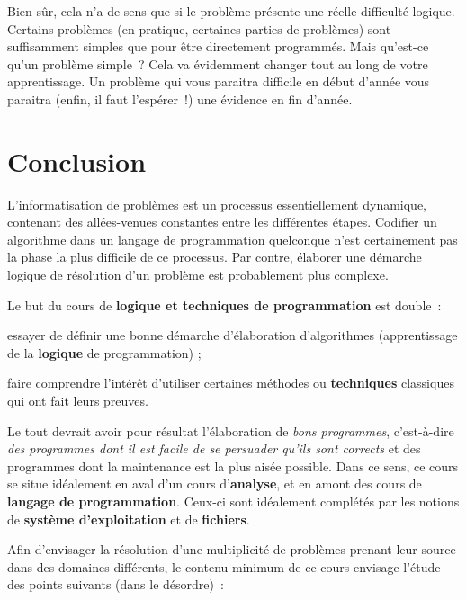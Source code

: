 	Bien sûr, cela n’a de sens que si le problème présente
	une réelle difficulté logique. Certains problèmes (en pratique,
	certaines parties de problèmes) sont suffisamment simples que pour être
	directement programmés. Mais qu’est-ce
	qu’un problème simple~? Cela va évidemment changer
	tout au long de votre apprentissage. Un problème qui vous paraitra
	difficile en début d’année vous paraitra (enfin, il
	faut l’espérer~!) une évidence en fin
	d’année.

\section{Conclusion}

	L’informatisation de problèmes est un processus essentiellement
	dynamique, contenant des allées-venues constantes entre les différentes
	étapes. Codifier un algorithme dans un langage de programmation
	quelconque n’est certainement pas la phase la plus difficile de ce
	processus. Par contre, élaborer une démarche logique de résolution d’un
	problème est probablement plus complexe.
	
	Le but du cours de \textbf{logique et techniques de programmation} est
	double~:

	\begin{liste}
	\item
		essayer de définir une bonne démarche d’élaboration d’algorithmes
		(apprentissage de la \textbf{logique} de programmation) ;
	\item
		faire comprendre l’intérêt d’utiliser certaines méthodes ou
		\textbf{techniques} classiques qui ont fait leurs preuves.
	\end{liste}

	Le tout devrait avoir pour résultat l’élaboration de \textit{bons
	programmes}, c’est-à-dire \textit{des programmes dont il est facile de
	se persuader qu’ils sont corrects} et des programmes dont la
	maintenance est la plus aisée possible. Dans ce sens, ce cours se situe
	idéalement en aval d’un cours d’\textbf{analyse}, et en amont des cours
	de \textbf{langage de programmation}. Ceux-ci sont idéalement complétés
	par les notions de \textbf{système d’exploitation} et de
	\textbf{fichiers}.

	Afin d’envisager la résolution d’une multiplicité de problèmes prenant
	leur source dans des domaines différents, le contenu minimum de ce
	cours envisage l’étude des points suivants (dans le désordre)~:

